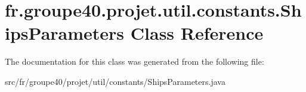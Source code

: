 \hypertarget{classfr_1_1groupe40_1_1projet_1_1util_1_1constants_1_1_ships_parameters}{}\section{fr.\+groupe40.\+projet.\+util.\+constants.\+Ships\+Parameters Class Reference}
\label{classfr_1_1groupe40_1_1projet_1_1util_1_1constants_1_1_ships_parameters}


The documentation for this class was generated from the following file\+:\begin{DoxyCompactItemize}
\item 
src/fr/groupe40/projet/util/constants/Ships\+Parameters.\+java\end{DoxyCompactItemize}
